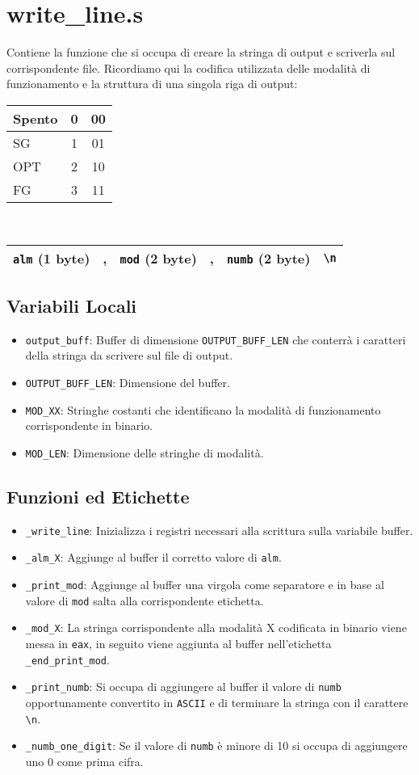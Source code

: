 \documentclass[a4paper,11pt]{article}
\newcommand{\itemtt}[1]{\item \texttt{#1}}
\begin{document}
	\section{write\_line.s}
	Contiene la funzione che si occupa di creare la stringa di output e scriverla sul corrispondente file. 
	Ricordiamo qui la codifica utilizzata delle modalità di funzionamento e la struttura di una singola riga di output:
		\begin{table}[!h]
			\centering
			\begin{tabular}{| l | c | c |}
				\hline
				Spento & 0 & 00 \\ \hline
				SG & 1 & 01 \\ \hline
				OPT & 2 & 10 \\ \hline
				FG & 3 & 11 \\ \hline
			\end{tabular}
			\\
			\vspace{5mm}
			\begin{tabular}{| c | c | c | c | c | c |}
				\hline
				\texttt{alm} (1 byte) & , & \texttt{mod} (2 byte) & , & \texttt{numb} (2 byte) &  \texttt{\textbackslash n} \\ \hline
			\end{tabular}
		\end{table}
	\subsection{Variabili Locali}
		\begin{itemize}
			\itemtt{output\_buff}: Buffer di dimensione \texttt{OUTPUT\_BUFF\_LEN} che conterrà i caratteri della stringa da scrivere sul file di output.
			\itemtt{OUTPUT\_BUFF\_LEN}: Dimensione del buffer.
			\itemtt{MOD\_XX}: Stringhe costanti che identificano la modalità di funzionamento corrispondente in binario.
			\itemtt{MOD\_LEN}: Dimensione delle stringhe di modalità.
		\end{itemize}
			
	\subsection{Funzioni ed Etichette}
		\begin{itemize}
			\itemtt{\_write\_line}: Inizializza i registri necessari alla scrittura sulla variabile buffer.
			\itemtt{\_alm\_X}: Aggiunge al buffer il corretto valore di \texttt{alm}.
			\itemtt{\_print\_mod}: Aggiunge al buffer una virgola come separatore e in base al valore di \texttt{mod} salta alla corrispondente etichetta.
			\itemtt{\_mod\_X}: La stringa corrispondente alla modalità X codificata in binario viene messa in \texttt{eax}, in seguito viene aggiunta al buffer nell'etichetta \texttt{\_end\_print\_mod}.
			\itemtt{\_print\_numb}: Si occupa di aggiungere al buffer il valore di \texttt{numb} opportunamente convertito in \texttt{ASCII} e di terminare la stringa con il carattere \texttt{\textbackslash n}.
			\itemtt{\_numb\_one\_digit}: Se il valore di \texttt{numb} è minore di 10 si occupa di aggiungere uno 0 come prima cifra.
		\end{itemize}
	
\end{document}
